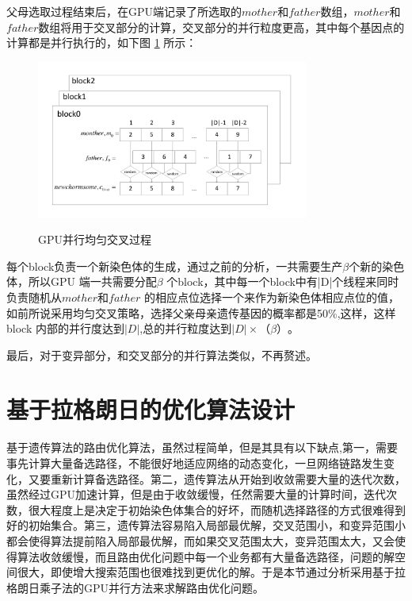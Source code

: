 父母选取过程结束后，在GPU端记录了所选取的$mother$和$father$数组，$mother$和$father$数组将用于交叉部分的计算，交叉部分的并行粒度更高，其中每个基因点的计算都是并行执行的，如下图 \ref{cross} 所示：
\begin{figure}
\begin{center}
{\includegraphics[width=0.8\textwidth]{figures/GPUcross.pdf}}
\end{center}
\caption{{\footnotesize{GPU并行均匀交叉过程}}}
\label{cross}
\end{figure}
每个block负责一个新染色体的生成，通过之前的分析，一共需要生产$\beta$个新的染色体，所以GPU 端一共需要分配$\beta$ 个block，其中每一个block中有|D|个线程来同时负责随机从$mother$和$father$ 的相应点位选择一个来作为新染色体相应点位的值，如前所说采用均匀交叉策略，选择父亲母亲遗传基因的概率都是50\%,这样，这样block 内部的并行度达到$|D|$,总的并行粒度达到$|D| \times（\beta）$。

最后，对于变异部分，和交叉部分的并行算法类似，不再赘述。
\section{基于拉格朗日的优化算法设计}

基于遗传算法的路由优化算法，虽然过程简单，但是其具有以下缺点,第一，需要事先计算大量备选路径，不能很好地适应网络的动态变化，一旦网络链路发生变化，又要重新计算备选路径。第二，遗传算法从开始到收敛需要大量的迭代次数，虽然经过GPU加速计算，但是由于收敛缓慢，任然需要大量的计算时间，迭代次数，很大程度上是决定于初始染色体集合的好坏，而随机选择路径的方式很难得到好的初始集合。第三，遗传算法容易陷入局部最优解，交叉范围小，和变异范围小都会使得算法提前陷入局部最优解，而如果交叉范围太大，变异范围太大，又会使得算法收敛缓慢，而且路由优化问题中每一个业务都有大量备选路径，问题的解空间很大，即使增大搜索范围也很难找到更优化的解。于是本节通过分析采用基于拉格朗日乘子法的GPU并行方法来求解路由优化问题。
